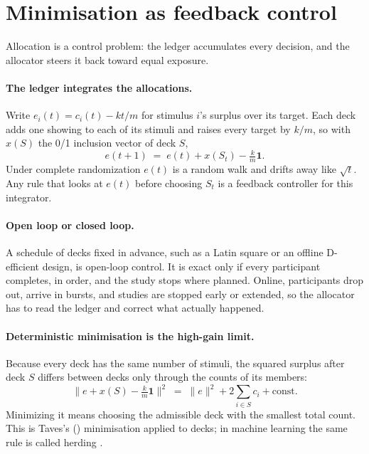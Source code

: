 \documentclass[11pt]{article}
\begin{document}
\section{Minimisation as feedback control}\label{sec:control}

Allocation is a control problem: the ledger accumulates every decision, and the allocator steers it back toward equal exposure.

\paragraph{The ledger integrates the allocations.} Write $e_i(t) = c_i(t) - kt/m$ for stimulus $i$'s surplus over its target. Each deck adds one showing to each of its stimuli and raises every target by $k/m$, so with $x(S)$ the 0/1 inclusion vector of deck $S$,
\begin{equation}
e(t+1) \;=\; e(t) + x(S_t) - \tfrac{k}{m}\mathbf{1}.
\end{equation}
Under complete randomization $e(t)$ is a random walk and drifts away like $\sqrt{t}$. Any rule that looks at $e(t)$ before choosing $S_t$ is a feedback controller for this integrator.

\paragraph{Open loop or closed loop.} A schedule of decks fixed in advance, such as a Latin square or an offline D-efficient design, is open-loop control. It is exact only if every participant completes, in order, and the study stops where planned. Online, participants drop out, arrive in bursts, and studies are stopped early or extended, so the allocator has to read the ledger and correct what actually happened.

\paragraph{Deterministic minimisation is the high-gain limit.} Because every deck has the same number of stimuli, the squared surplus after deck $S$ differs between decks only through the counts of its members:
\begin{equation}
\big\| e + x(S) - \tfrac{k}{m}\mathbf{1}\big\|^{2} \;=\; \|e\|^{2} + 2\sum_{i\in S} c_i + \text{const}.
\end{equation}
Minimizing it means choosing the admissible deck with the smallest total count. This is Taves's (\citeyear{taves1974}) minimisation applied to decks; in machine learning the same rule is called herding \citep{welling2009}.
\end{document}
